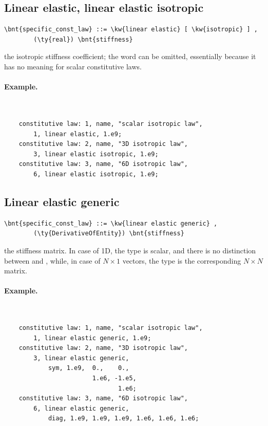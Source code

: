 \subsection{Linear elastic, linear elastic isotropic}
\begin{Verbatim}[commandchars=\\\{\}]
    \bnt{specific_const_law} ::= \kw{linear elastic} [ \kw{isotropic} ] , 
        (\ty{real}) \bnt{stiffness}
\end{Verbatim}
the isotropic stiffness coefficient; the word 
can be omitted, essentially because it has no meaning
for scalar constitutive laws.

\paragraph{Example.} \
\begin{verbatim}
    constitutive law: 1, name, "scalar isotropic law",
        1, linear elastic, 1.e9;
    constitutive law: 2, name, "3D isotropic law",
        3, linear elastic isotropic, 1.e9;
    constitutive law: 3, name, "6D isotropic law",
        6, linear elastic isotropic, 1.e9;
\end{verbatim}
  
  
\subsection{Linear elastic generic}
\begin{Verbatim}[commandchars=\\\{\}]
    \bnt{specific_const_law} ::= \kw{linear elastic generic} ,
        (\ty{DerivativeOfEntity}) \bnt{stiffness}
\end{Verbatim}
the stiffness matrix. In case of 1D, the type is scalar, 
and there is no distinction between  and , 
while, in case of $N \times 1$ vectors, the type is the corresponding 
$N \times N$ matrix.

\paragraph{Example.} \
\begin{verbatim}
    constitutive law: 1, name, "scalar isotropic law",
        1, linear elastic generic, 1.e9;
    constitutive law: 2, name, "3D isotropic law",
        3, linear elastic generic,
            sym, 1.e9,  0.,    0.,
                        1.e6, -1.e5,
                               1.e6;
    constitutive law: 3, name, "6D isotropic law",
        6, linear elastic generic,
            diag, 1.e9, 1.e9, 1.e9, 1.e6, 1.e6, 1.e6;
\end{verbatim}
  

